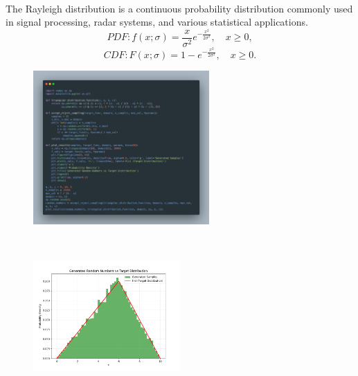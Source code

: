 \documentclass[a4paper,12pt]{article}
\begin{document}
\\ The Rayleigh distribution is a continuous probability distribution commonly used in signal processing, radar systems, and various statistical applications.
\[
PDF: f(x; \sigma) = \frac{x}{\sigma^2} e^{-\frac{x^2}{2\sigma^2}}, \quad x \geq 0,
\]
\[
CDF: F(x; \sigma) = 1 - e^{-\frac{x^2}{2\sigma^2}}, \quad x \geq 0.
\]
\begin{figure}[h!]
    \centering
    \includegraphics[width=0.6\textwidth]{./Screenshots/4.py.png} 
\end{figure} \\
\begin{figure}[h!]
    \centering
    \includegraphics[width=0.5\textwidth]{./Screenshots/4.png} 
\end{figure} 
\newpage
\end{document}
